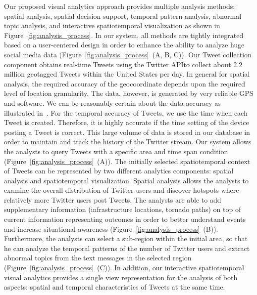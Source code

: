 Our proposed visual analytics approach provides multiple analysis methods: spatial analysis, spatial decision support, temporal pattern analysis, abnormal topic analysis, and interactive spatiotemporal visualization as shown in Figure~\ref{fig:analysis_process}.
In our system, all methods are tightly integrated based on a user-centered design in order to enhance the ability to analyze huge social media data (Figure~\ref{fig:analysis_process}~(A, B, C)).
Our Tweet collection component obtains real-time Tweets using the Twitter API\textemdash to collect about 2.2 million geotagged Tweets within the United States per day.
In general for spatial analysis, the required accuracy of the geocoordinate depends upon the required level of location granularity.
The data, however, is generated by very reliable GPS and software.
We can be reasonably certain about the data accuracy as illustrated in~\cite{TWITTER:2013:GOT}.
For the temporal accuracy of Tweets, we use the time when each Tweet is created. 
Therefore, it is highly accurate if the time setting of the device posting a Tweet is correct.
This large volume of data is stored in our database in order to maintain and track the history of the Twitter stream.
Our system allows the analysts to query Tweets with a specific area and time span condition (Figure~\ref{fig:analysis_process}~(A)).
The initially selected spatiotemporal context of Tweets can be represented by two different analytics components: spatial analysis and spatiotemporal visualization.
Spatial analysis allows the analysts to examine the overall distribution of Twitter users and discover hotspots where relatively more Twitter users post Tweets.
The analysts are able to add supplementary information (infrastructure locations, tornado paths) on top of current information representing outcomes in order to better understand events and increase situational awareness (Figure~\ref{fig:analysis_process}~(B)).
Furthermore, the analysts can select a sub-region within the initial area, so that he can analyze the temporal patterns of the number of Twitter users and extract abnormal topics from the text messages in the selected region (Figure~\ref{fig:analysis_process}~(C)).
In addition, our interactive spatiotemporal visual analytics provides a single view representation for the analysis of both aspects: spatial and temporal characteristics of Tweets at the same time.


